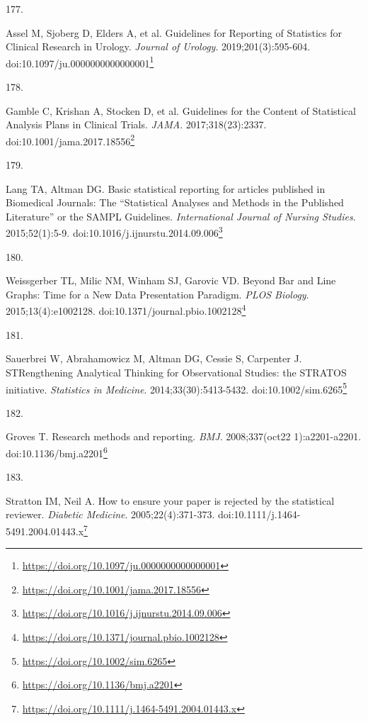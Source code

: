 \documentclass[
]{book}
\newlength{\cslhangindent}
\newlength{\csllabelwidth}
\newlength{\cslentryspacingunit} %
\newenvironment{CSLReferences}[2] %
 {%
  \setlength{\parindent}{0pt}
  \ifodd #1
  \let\oldpar\par
  \def\par{\hangindent=\cslhangindent\oldpar}
  \fi
  \setlength{\parskip}{#2\cslentryspacingunit}
 }%
 {}
\newcommand{\CSLLeftMargin}[1]{\parbox[t]{\csllabelwidth}{#1}}
\newcommand{\CSLRightInline}[1]{\parbox[t]{\linewidth - \csllabelwidth}{#1}\break}
\renewcommand{\href}[2]{#2\footnote{\url{#1}}}
\begin{document}
\begin{CSLReferences}{0}{0}
\leavevmode{}%
\CSLLeftMargin{177. }%
\CSLRightInline{Assel M, Sjoberg D, Elders A, et al. Guidelines for Reporting of Statistics for Clinical Research in Urology. \emph{Journal of Urology}. 2019;201(3):595-604. doi:\href{https://doi.org/10.1097/ju.0000000000000001}{10.1097/ju.0000000000000001}}

\leavevmode{}%
\CSLLeftMargin{178. }%
\CSLRightInline{Gamble C, Krishan A, Stocken D, et al. Guidelines for the Content of Statistical Analysis Plans in Clinical Trials. \emph{JAMA}. 2017;318(23):2337. doi:\href{https://doi.org/10.1001/jama.2017.18556}{10.1001/jama.2017.18556}}

\leavevmode{}%
\CSLLeftMargin{179. }%
\CSLRightInline{Lang TA, Altman DG. Basic statistical reporting for articles published in Biomedical Journals: The {``}Statistical Analyses and Methods in the Published Literature{''} or the SAMPL Guidelines. \emph{International Journal of Nursing Studies}. 2015;52(1):5-9. doi:\href{https://doi.org/10.1016/j.ijnurstu.2014.09.006}{10.1016/j.ijnurstu.2014.09.006}}

\leavevmode{}%
\CSLLeftMargin{180. }%
\CSLRightInline{Weissgerber TL, Milic NM, Winham SJ, Garovic VD. Beyond Bar and Line Graphs: Time for a New Data Presentation Paradigm. \emph{PLOS Biology}. 2015;13(4):e1002128. doi:\href{https://doi.org/10.1371/journal.pbio.1002128}{10.1371/journal.pbio.1002128}}

\leavevmode{}%
\CSLLeftMargin{181. }%
\CSLRightInline{Sauerbrei W, Abrahamowicz M, Altman DG, Cessie S, Carpenter J. STRengthening Analytical Thinking for Observational Studies: the STRATOS initiative. \emph{Statistics in Medicine}. 2014;33(30):5413-5432. doi:\href{https://doi.org/10.1002/sim.6265}{10.1002/sim.6265}}

\leavevmode{}%
\CSLLeftMargin{182. }%
\CSLRightInline{Groves T. Research methods and reporting. \emph{BMJ}. 2008;337(oct22 1):a2201-a2201. doi:\href{https://doi.org/10.1136/bmj.a2201}{10.1136/bmj.a2201}}

\leavevmode{}%
\CSLLeftMargin{183. }%
\CSLRightInline{Stratton IM, Neil A. How to ensure your paper is rejected by the statistical reviewer. \emph{Diabetic Medicine}. 2005;22(4):371-373. doi:\href{https://doi.org/10.1111/j.1464-5491.2004.01443.x}{10.1111/j.1464-5491.2004.01443.x}}


\end{CSLReferences}
\end{document}
